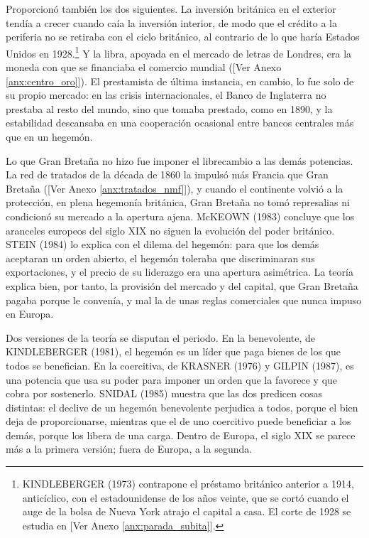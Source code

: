 \documentclass[10pt,a4paper]{article}
\newcommand{\authorfont}[1]{{\fontfamily{EBGaramond-TLF}\selectfont #1}}
\begin{document}
Proporcionó también los dos siguientes. La inversión británica en el exterior tendía a crecer cuando caía la inversión interior, de modo que el crédito a la periferia no se retiraba con el ciclo británico, al contrario de lo que haría Estados Unidos en 1928.\footnote{%
    KINDLEBERGER (1973) contrapone el préstamo británico anterior a 1914, anticíclico, con el estadounidense de los años veinte, que se cortó cuando el auge de la bolsa de Nueva York atrajo el capital a casa. El corte de 1928 se estudia en [\authorfont{Ver Anexo \ref{anx:parada_subita}}].
} Y la libra, apoyada en el mercado de letras de Londres, era la moneda con que se financiaba el comercio mundial ([\authorfont{Ver Anexo \ref{anx:centro_oro}}]). El prestamista de última instancia, en cambio, lo fue solo de su propio mercado: en las crisis internacionales, el Banco de Inglaterra no prestaba al resto del mundo, sino que tomaba prestado, como en 1890, y la estabilidad descansaba en una cooperación ocasional entre bancos centrales más que en un hegemón.

Lo que Gran Bretaña no hizo fue imponer el librecambio a las demás potencias. La red de tratados de la década de 1860 la impulsó más Francia que Gran Bretaña ([\authorfont{Ver Anexo \ref{anx:tratados_nmf}}]), y cuando el continente volvió a la protección, en plena hegemonía británica, Gran Bretaña no tomó represalias ni condicionó su mercado a la apertura ajena. McKEOWN (1983) concluye que los aranceles europeos del siglo XIX no siguen la evolución del poder británico. STEIN (1984) lo explica con el dilema del hegemón: para que los demás aceptaran un orden abierto, el hegemón toleraba que discriminaran sus exportaciones, y el precio de su liderazgo era una apertura asimétrica. La teoría explica bien, por tanto, la provisión del mercado y del capital, que Gran Bretaña pagaba porque le convenía, y mal la de unas reglas comerciales que nunca impuso en Europa.

Dos versiones de la teoría se disputan el periodo. En la benevolente, de KINDLEBERGER (1981), el hegemón es un líder que paga bienes de los que todos se benefician. En la coercitiva, de KRASNER (1976) y GILPIN (1987), es una potencia que usa su poder para imponer un orden que la favorece y que cobra por sostenerlo. SNIDAL (1985) muestra que las dos predicen cosas distintas: el declive de un hegemón benevolente perjudica a todos, porque el bien deja de proporcionarse, mientras que el de uno coercitivo puede beneficiar a los demás, porque los libera de una carga. Dentro de Europa, el siglo XIX se parece más a la primera versión; fuera de Europa, a la segunda.
\end{document}
